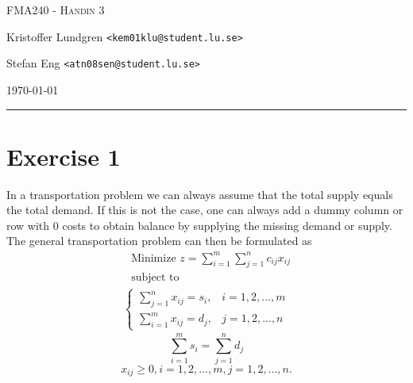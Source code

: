 \documentclass{article}
\begin{document}


\begin{centering}
	{\scshape\Large FMA240 - Handin 3\par}
	\vspace{0.5cm}
	Kristoffer Lundgren \texttt{<kem01klu@student.lu.se>}\par
	Stefan Eng \texttt{<atn08sen@student.lu.se>}\par
    \vspace{0.5cm}
	\today\par
    \rule{\textwidth}{0.4pt}
\end{centering}

\section*{Exercise 1}
  In a transportation problem we can always assume that the total supply equals the total demand. If this is not the case, one can always add a dummy column or row with 0 costs to obtain balance by supplying the missing demand or supply. The general transportation problem can then be formulated as
  \begin{align*}
  & \text{Minimize } z = \sum_{i=1}^{m}\sum_{j=1}^n c_{ij}x_{ij} \\
  & \text{subject to}
    \label{eq1}
  \end{align*}
  \begin{align}
    \begin{cases}
      \sum_{j=1}^{n} x_{ij} = s_{i}, & i = 1, 2, ..., m \\
      \sum_{i=1}^{m} x_{ij} = d_{j}, & j = 1, 2, ..., n
    \end{cases}
  \end{align}
  \begin{equation}
    \sum_{i=1}^{m} s_{i} = \sum_{j=1}^n d_{j}
    \label{eq3}
  \end{equation}
  \begin{equation}
    x_{ij} \geq 0, i = 1, 2, ..., m, j = 1, 2, ..., n.
    \label{eq4}
  \end{equation}
\end{document}
